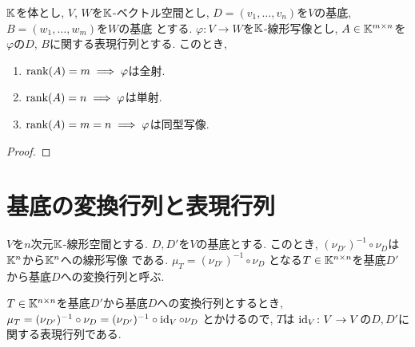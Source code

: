 \begin{prop}
  $\mathbb{K}$を体とし,
  $V$, $W$を$\mathbb{K}$-ベクトル空間とし,
  $D=(v_1,\ldots,v_n)$を$V$の基底,
  $B=(w_1,\ldots,w_m)$を$W$の基底
  とする.
  $\varphi\colon V\to W$を$\mathbb{K}$-線形写像とし,
  $A\in\mathbb{K}^{m\times n}$を$\varphi$の$D$, $B$に関する表現行列とする.
  このとき,
\begin{enumerate}
  \item $\operatorname{rank}(A)=m\implies \varphi$は全射.
  \item $\operatorname{rank}(A)=n\implies \varphi$は単射.
  \item $\operatorname{rank}(A)=m=n\implies \varphi$は同型写像.
\end{enumerate}
\end{prop}
\begin{proof}\end{proof}

\section{基底の変換行列と表現行列}

\begin{definition}
  $V$を$n$次元$\mathbb{K}$-線形空間とする.
  $D,D'$を$V$の基底とする.
  このとき, $(\nu_{D'})^{-1}\circ\nu_{D}$は$\mathbb{K}^n$から$\mathbb{K}^n$への線形写像
  である.
  $\mu_T=(\nu_{D'})^{-1}\circ\nu_{D}$
  となる$T\in\mathbb{K}^{n\times n}$を基底$D'$から基底$D$への変換行列と呼ぶ.
\end{definition}
\begin{remark}
  $T\in\mathbb{K}^{n\times n}$を基底$D'$から基底$D$への変換行列とするとき,
  $\mu_T=(\nu_{D'})^{-1}\circ\nu_{D}=(\nu_{D'})^{-1}\circ\operatorname{id}_{V}\circ\nu_{D}$
  とかけるので,
  $T$は
  $\operatorname{id}_{V}\colon V\to V$の$D,D'$に関する表現行列である.
\end{remark}


